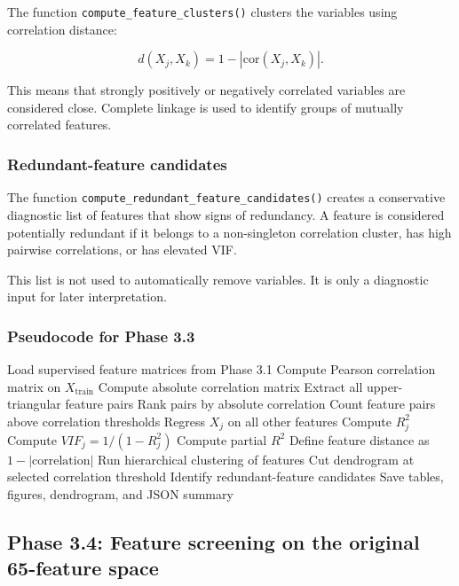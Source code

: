 \documentclass{ipgpmaster}
\begin{document}
The function \texttt{compute\_feature\_clusters()} clusters the variables using correlation distance:

\[
d(X_j, X_k) = 1 - |\mathrm{cor}(X_j, X_k)|.
\]

This means that strongly positively or negatively correlated variables are considered close. Complete linkage is used to identify groups of mutually correlated features.

\subsubsection{Redundant-feature candidates}

The function \texttt{compute\_redundant\_feature\_candidates()} creates a conservative diagnostic list of features that show signs of redundancy. A feature is considered potentially redundant if it belongs to a non-singleton correlation cluster, has high pairwise correlations, or has elevated VIF.

This list is not used to automatically remove variables. It is only a diagnostic input for later interpretation.

\subsubsection{Pseudocode for Phase 3.3}

\begin{algorithm}[H]
\caption{Phase 3.3: Multicollinearity diagnostics}
\begin{algorithmic}[1]
\State Load supervised feature matrices from Phase 3.1
\State Compute Pearson correlation matrix on \(X_{\text{train}}\)
\State Compute absolute correlation matrix
\State Extract all upper-triangular feature pairs
\State Rank pairs by absolute correlation
\State Count feature pairs above correlation thresholds
    \State Regress \(X_j\) on all other features
    \State Compute \(R_j^2\)
    \State Compute \(VIF_j = 1/(1-R_j^2)\)
    \State Compute partial \(R^2\)
\EndFor
\State Define feature distance as \(1 - |\mathrm{correlation}|\)
\State Run hierarchical clustering of features
\State Cut dendrogram at selected correlation threshold
\State Identify redundant-feature candidates
\State Save tables, figures, dendrogram, and JSON summary
\end{algorithmic}
\end{algorithm}

\subsection{Phase 3.4: Feature screening on the original 65-feature space}
\end{document}
